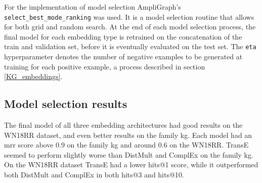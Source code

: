 For the implementation of model selection AmpliGraph's \texttt{select\_best\_mode\_ranking} was used. It is a model selection routine that allows for both grid and random search. At the end of each model selection process, the final model for each embedding type is retrained on the concatenation of the train and validation set, before it is eventually evaluated on the test set. The \texttt{eta} hyperparameter denotes the number of negative examples to be generated at training for each positive example, a process described in section \ref{KG_embeddings}. %

\subsection{Model selection results}
The final model of all three embedding architectures had good results on the WN18RR dataset, and even better results on the family \gls{kg}. Each model had an \gls{mrr} score above 0.9 on the family \gls{kg} and around 0.6 on the WN18RR. TransE seemed to perform slightly worse than DistMult and ComplEx on the family \gls{kg}. On the WN18RR dataset TransE had a lower hits@1 score, while it outperformed both DistMult and ComplEx in both hits@3 and hits@10.
